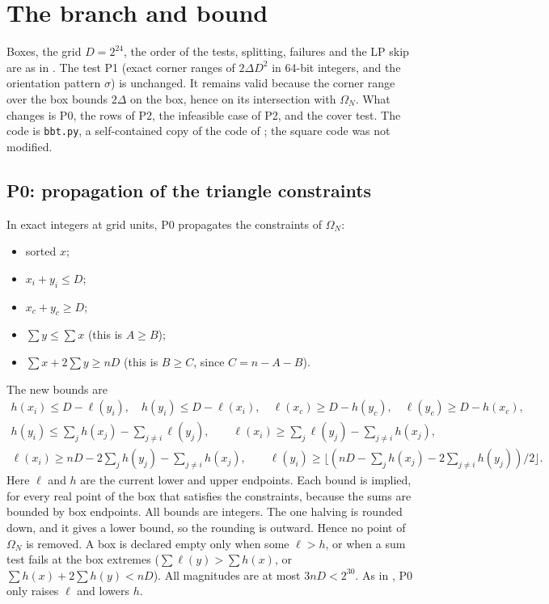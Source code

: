 \documentclass[11pt]{amsart}
\theoremstyle{definition}
\newcommand{\Om}{\Omega}
\begin{document}
\section{The branch and bound}\label{sec:tests}

Boxes, the grid $D = 2^{24}$, the order of the tests, splitting, failures and the LP skip are as in \cite[Sec.~4]{N9}. The test P1 (exact corner ranges of $2\Delta D^2$ in 64-bit integers, and the orientation pattern $\sigma$) is unchanged. It remains valid because the corner range over the box bounds $2\Delta$ on the box, hence on its intersection with $\Om_N$. What changes is P0, the rows of P2, the infeasible case of P2, and the cover test. The code is \texttt{bbt.py}, a self-contained copy of the code of \cite{N9}; the square code was not modified. %

\subsection{P0: propagation of the triangle constraints}
In exact integers at grid units, P0 propagates the constraints of $\Om_N$:
\begin{itemize}
\item sorted $x$;
\item $x_i + y_i \le D$;
\item $x_c + y_c \ge D$;
\item $\sum y \le \sum x$ (this is $A \ge B$);
\item $\sum x + 2\sum y \ge nD$ (this is $B \ge C$, since $C = n - A - B$).
\end{itemize}
The new bounds are
\begin{gather*}
h(x_i) \le D - \ell(y_i),\quad h(y_i) \le D - \ell(x_i),\quad \ell(x_c) \ge D - h(y_c),\quad \ell(y_c) \ge D - h(x_c),\\
h(y_i) \le \textstyle\sum_j h(x_j) - \sum_{j\ne i}\ell(y_j),\qquad \ell(x_i) \ge \sum_j \ell(y_j) - \sum_{j \ne i} h(x_j),\\
\ell(x_i) \ge nD - 2\textstyle\sum_j h(y_j) - \sum_{j\ne i}h(x_j),\qquad \ell(y_i) \ge \bigl\lfloor (nD - \sum_j h(x_j) - 2\sum_{j\ne i}h(y_j))/2 \bigr\rfloor .
\end{gather*}
Here $\ell$ and $h$ are the current lower and upper endpoints. Each bound is implied, for every real point of the box that satisfies the constraints, because the sums are bounded by box endpoints. All bounds are integers. The one halving is rounded down, and it gives a lower bound, so the rounding is outward. Hence no point of $\Om_N$ is removed. A box is declared empty only when some $\ell > h$, or when a sum test fails at the box extremes ($\sum\ell(y) > \sum h(x)$, or $\sum h(x) + 2\sum h(y) < nD$). All magnitudes are at most $3nD < 2^{30}$. As in \cite[App.~A.1]{N9}, P0 only raises $\ell$ and lowers $h$. %
\end{document}
